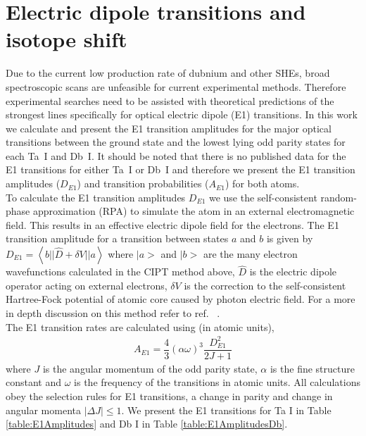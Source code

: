 \documentclass[10pt,a4paper, twoside, openright]{report}
\begin{document}
\section{Electric dipole transitions and isotope shift} \label{sec:E1transitions}
Due to the current low production rate of dubnium and other SHEs, broad spectroscopic scans are unfeasible for current experimental methods. Therefore experimental searches need to be assisted with theoretical predictions of the strongest lines specifically for optical electric dipole (E1) transitions. In this work we calculate and present the E1 transition amplitudes for the major optical  transitions between the ground state and the  lowest lying odd parity states for each Ta~I and Db~I. It should be noted that there is no published data for the E1 transitions for either Ta~I or Db~I and therefore we present the E1 transition amplitudes ($D_{E1}$)  and transition probabilities ($A_{E1}$) for both atoms. \\
\linebreak
To calculate the E1 transition amplitudes $D_{E1}$ we use the self-consistent random-phase approximation (RPA) to simulate the atom in an external electromagnetic field. This results in an effective electric dipole field for the electrons. The E1 transition amplitude for a transition between states $a$ and $b$ is given by $D_{E1} = \left< b || \hat D + \delta V || a\right>$ where $|a>$ and $|b>$ are the many electron wavefunctions calculated in the CIPT method above, $\hat D$ is the electric dipole operator acting on external electrons, $\delta V$ is the correction to the self-consistent Hartree-Fock potential of atomic core caused by photon electric field. For a more in depth discussion on this method refer to ref. ~\cite{Dzuba2018}. \\
\linebreak
The E1 transition rates are calculated using (in atomic units),
\begin{align*}
A_{E1} = \dfrac{4}{3}\left(\alpha \omega\right)^3\dfrac{ D_{E1}^2}{2J + 1}
\end{align*}
where $J$ is the angular momentum of the odd parity state, $\alpha$ is the fine structure constant and $\omega$ is the frequency of the transitions in atomic units. All calculations obey the selection rules for E1 transitions, a change in parity and change in angular momenta $|\Delta J| \leq 1 $. We present the E1 transitions for Ta I in Table \ref{table:E1Amplitudes} and Db I in Table \ref{table:E1AmplitudesDb}.\\
\end{document}
